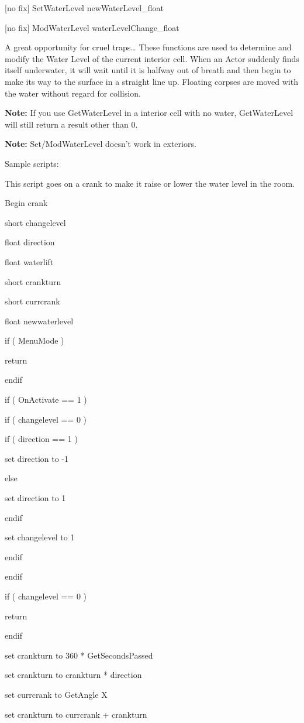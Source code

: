 \documentclass[
]{article}
\begin{document}
{[}no fix{]} SetWaterLevel newWaterLevel\_float

{[}no fix{]} ModWaterLevel waterLevelChange\_float

A great opportunity for cruel traps\ldots{} These functions are used to
determine and modify the Water Level of the current interior cell. When
an Actor suddenly finds itself underwater, it will wait until it is
halfway out of breath and then begin to make its way to the surface in a
straight line up. Floating corpses are moved with the water without
regard for collision.

\textbf{Note:} If you use GetWaterLevel in a interior cell with no
water, GetWaterLevel will still return a result other than 0.

\textbf{Note:} Set/ModWaterLevel doesn't work in exteriors.

Sample scripts:

This script goes on a crank to make it raise or lower the water level in
the room.

Begin crank

short changelevel

float direction

float waterlift

short crankturn

short currcrank

float newwaterlevel

if ( MenuMode )

return

endif

if ( OnActivate == 1 )

if ( changelevel == 0 )

if ( direction == 1 )

set direction to -1

else

set direction to 1

endif

set changelevel to 1

endif

endif

if ( changelevel == 0 )

return

endif

set crankturn to 360 * GetSecondsPassed

set crankturn to crankturn * direction

set currcrank to GetAngle X

set crankturn to currcrank + crankturn
\end{document}
